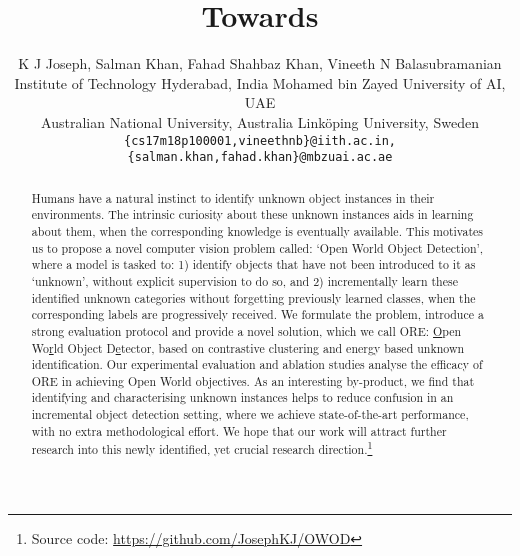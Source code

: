 \documentclass[final]{cvpr}
\begin{document}
\title{Towards \OWOD \vspace{-10pt}}

\author{K J Joseph,  Salman Khan, Fahad Shahbaz Khan, Vineeth N Balasubramanian\\
\normalsizeIndian Institute of Technology Hyderabad, India \quad Mohamed bin Zayed University of AI, UAE\\
\normalsize Australian National University, Australia \quad Linköping University, Sweden\\
{\tt\small \{cs17m18p100001,vineethnb\}@iith.ac.in, \{salman.khan,fahad.khan\}@mbzuai.ac.ae}
\vspace{-10pt}
}

\newcommand{\OWOD}{Open World Object Detection\xspace}

\newcommand{\owod}{open world object detection\xspace}

\newcommand{\OSOD}{Open Set Object Detection\xspace}

\newcommand{\osod}{open set object detection\xspace}

\newcommand{\os}{open set\xspace}

\newcommand{\ow}{open world\xspace}

\newcommand{\OS}{Open Set\xspace}

\newcommand{\OW}{Open World\xspace}

\newcommand{\method}{ORE\xspace}

\maketitle


\begin{abstract}\vspace{-0.5em}
   Humans have a natural instinct to identify unknown object instances in their environments. The intrinsic curiosity about these unknown instances aids in learning about them, when the corresponding knowledge is eventually available. This motivates us to propose a novel computer vision problem called: `Open World Object Detection', where a model is tasked to: 1) identify objects that have not been introduced to it as `unknown', without explicit supervision to do so, and 2) incrementally learn these identified unknown categories without forgetting previously learned classes, when the corresponding labels are progressively received. We formulate the problem, introduce a strong evaluation protocol and provide a novel solution, which we call \method: \underline{O}pen Wo\underline{r}ld Object D\underline{e}tector, based on contrastive clustering and energy based unknown identification. Our experimental evaluation and ablation studies analyse the efficacy of \method in achieving \OW objectives. As an interesting by-product, we find that identifying and characterising unknown instances helps to reduce confusion in an incremental object detection setting, where we achieve state-of-the-art performance, with no extra methodological effort. We hope that our work will attract further research into this newly
identified, yet crucial research direction.\footnote{Source code: \footnotesize\url{https://github.com/JosephKJ/OWOD}} 
\end{abstract}
\end{document}
